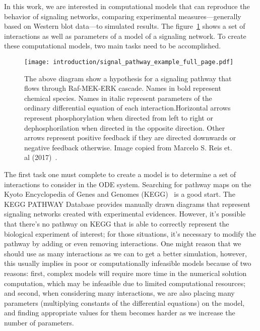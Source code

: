In this work, we are interested in computational models that can 
reproduce the behavior of signaling networks, comparing experimental 
measures---generally based on Western blot data---to simulated results.
The figure~\ref{fig:signal_pathway_example} shows a set of interactions
as well as parameters of a model of a signaling network. To create these 
computational models, two main tasks need to be accomplished.

\begin{figure}[!ht]
\centering 
    \texttt{[image: introduction/signal\_pathway\_example\_full\_page.pdf]}
\caption{The above diagram show a hypothesis for a signaling pathway 
    that flows through Raf-MEK-ERK cascade. Names in bold represent 
    chemical species. Names in italic represent parameters of the 
    ordinary differential equation of each interaction.Horizontal arrows
    represent phosphorylation when directed from left to right or 
    dephosphorilation when directed in the opposite direction. Other 
    arrows represent positive feedback if they are directed downwards or 
    negative feedback otherwise. Image copied from Marcelo S. Reis et.
    al (2017)~\cite{Reis2017}.}
\label{fig:signal_pathway_example}
\end{figure}

The first task one must complete to create a model is to determine a set 
of interactions to consider in the ODE system. Searching for pathway maps
on the Kyoto Encyclopedia of Genes and Genomes 
(KEGG)~\cite{Kanehisa2000kegg} is a good start. The KEGG PATHWAY 
Database provides manually drawn diagrams that represent signaling 
networks created with experimental evidences. However, it's possible 
that there's no pathway on KEGG that is able to correctly represent the 
biological experiment of interest; for those situations, it's necessary 
to modify the pathway by adding or even removing interactions. One might 
reason that we should use as many interactions as we can to get a better 
simulation, however, this usually implies in poor or computationally 
infeasible models because of two reasons: first, complex models will 
require more time in the numerical solution computation, which may be 
infeasible due to limited computational resources; and second, when 
considering many interactions, we are also placing many parameters 
(multiplying constants of the differential equations) on the model, and 
finding appropriate values for them becomes harder as we increase the 
number of parameters.

